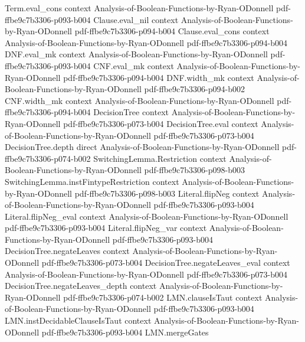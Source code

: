 \begin{theorem}
\proofstep
  {Term.eval_cons}
  {context}
  {Analysis-of-Boolean-Functions-by-Ryan-ODonnell}
  {pdf-ffbe9c7b3306-p093-b004}
\proofstep
  {Clause.eval_nil}
  {context}
  {Analysis-of-Boolean-Functions-by-Ryan-ODonnell}
  {pdf-ffbe9c7b3306-p094-b004}
\proofstep
  {Clause.eval_cons}
  {context}
  {Analysis-of-Boolean-Functions-by-Ryan-ODonnell}
  {pdf-ffbe9c7b3306-p094-b004}
\proofstep
  {DNF.eval_mk}
  {context}
  {Analysis-of-Boolean-Functions-by-Ryan-ODonnell}
  {pdf-ffbe9c7b3306-p093-b004}
\proofstep
  {CNF.eval_mk}
  {context}
  {Analysis-of-Boolean-Functions-by-Ryan-ODonnell}
  {pdf-ffbe9c7b3306-p094-b004}
\proofstep
  {DNF.width_mk}
  {context}
  {Analysis-of-Boolean-Functions-by-Ryan-ODonnell}
  {pdf-ffbe9c7b3306-p094-b002}
\proofstep
  {CNF.width_mk}
  {context}
  {Analysis-of-Boolean-Functions-by-Ryan-ODonnell}
  {pdf-ffbe9c7b3306-p094-b004}
\proofstep
  {DecisionTree}
  {context}
  {Analysis-of-Boolean-Functions-by-Ryan-ODonnell}
  {pdf-ffbe9c7b3306-p073-b004}
\proofstep
  {DecisionTree.eval}
  {context}
  {Analysis-of-Boolean-Functions-by-Ryan-ODonnell}
  {pdf-ffbe9c7b3306-p073-b004}
\proofstep
  {DecisionTree.depth}
  {direct}
  {Analysis-of-Boolean-Functions-by-Ryan-ODonnell}
  {pdf-ffbe9c7b3306-p074-b002}
\proofstep
  {SwitchingLemma.Restriction}
  {context}
  {Analysis-of-Boolean-Functions-by-Ryan-ODonnell}
  {pdf-ffbe9c7b3306-p098-b003}
\proofstep
  {SwitchingLemma.instFintypeRestriction}
  {context}
  {Analysis-of-Boolean-Functions-by-Ryan-ODonnell}
  {pdf-ffbe9c7b3306-p098-b003}
\proofstep
  {Literal.flipNeg}
  {context}
  {Analysis-of-Boolean-Functions-by-Ryan-ODonnell}
  {pdf-ffbe9c7b3306-p093-b004}
\proofstep
  {Literal.flipNeg_eval}
  {context}
  {Analysis-of-Boolean-Functions-by-Ryan-ODonnell}
  {pdf-ffbe9c7b3306-p093-b004}
\proofstep
  {Literal.flipNeg_var}
  {context}
  {Analysis-of-Boolean-Functions-by-Ryan-ODonnell}
  {pdf-ffbe9c7b3306-p093-b004}
\proofstep
  {DecisionTree.negateLeaves}
  {context}
  {Analysis-of-Boolean-Functions-by-Ryan-ODonnell}
  {pdf-ffbe9c7b3306-p073-b004}
\proofstep
  {DecisionTree.negateLeaves_eval}
  {context}
  {Analysis-of-Boolean-Functions-by-Ryan-ODonnell}
  {pdf-ffbe9c7b3306-p073-b004}
\proofstep
  {DecisionTree.negateLeaves_depth}
  {context}
  {Analysis-of-Boolean-Functions-by-Ryan-ODonnell}
  {pdf-ffbe9c7b3306-p074-b002}
\proofstep
  {LMN.clauseIsTaut}
  {context}
  {Analysis-of-Boolean-Functions-by-Ryan-ODonnell}
  {pdf-ffbe9c7b3306-p093-b004}
\proofstep
  {LMN.instDecidableClauseIsTaut}
  {context}
  {Analysis-of-Boolean-Functions-by-Ryan-ODonnell}
  {pdf-ffbe9c7b3306-p093-b004}
\proofstep
  {LMN.mergeGates}

\end{theorem}
